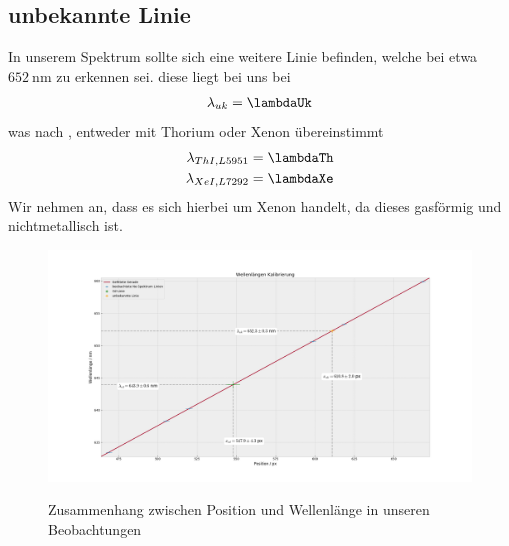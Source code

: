     \subsection{unbekannte Linie}
      In unserem Spektrum sollte sich eine weitere Linie befinden, welche bei etwa $\SI{652}{\nano\metre}$ zu erkennen sei. diese liegt bei uns bei
      \begin{align}
        \lambda_{uk} = \lambdaUk
      \end{align}
      was nach \cite{nist.gov.uk}, entweder mit Thorium oder Xenon übereinstimmt
      \begin{align}
        \lambda_{Th I, L5951} = \lambdaTh\\
        \lambda_{Xe I, L7292} = \lambdaXe
      \end{align}
      Wir nehmen an, dass es sich hierbei um Xenon handelt, da dieses gasförmig und nichtmetallisch ist.

    \begin{landscape}
      \thispagestyle{empty}
      \begin{figure}
        \vspace*{-2cm}
        \caption{Zusammenhang zwischen Position und Wellenlänge in unseren Beobachtungen}
        \hspace*{-6cm}\includegraphics[width=1.5\paperwidth]{Auswertung/wavelength_analysis/wl_ne_cal}
        \label{plt::6}
      \end{figure}
    \end{landscape}
